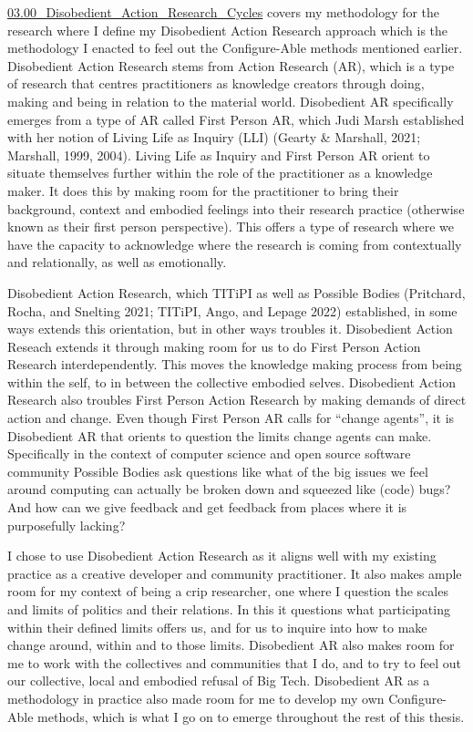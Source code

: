 \href{../../03_Disobedient_Action_Research_Cycles/sections/03.00_Disobedient_Action_Research_Cycles.md}{03.00\_Disobedient\_Action\_Research\_Cycles}
covers my methodology for the research where I define my Disobedient
Action Research approach which is the methodology I enacted to feel out
the Configure-Able methods mentioned earlier. Disobedient Action
Research stems from Action Research (AR), which is a type of research
that centres practitioners as knowledge creators through doing, making
and being in relation to the material world. Disobedient AR specifically
emerges from a type of AR called First Person AR, which Judi Marsh
established with her notion of Living Life as Inquiry (LLI) (Gearty \&
Marshall, 2021; Marshall, 1999, 2004). Living Life as Inquiry and First
Person AR orient to situate themselves further within the role of the
practitioner as a knowledge maker. It does this by making room for the
practitioner to bring their background, context and embodied feelings
into their research practice (otherwise known as their first person
perspective). This offers a type of research where we have the capacity
to acknowledge where the research is coming from contextually and
relationally, as well as emotionally.

Disobedient Action Research, which TITiPI as well as Possible Bodies
(Pritchard, Rocha, and Snelting 2021; TITiPI, Ango, and Lepage 2022)
established, in some ways extends this orientation, but in other ways
troubles it. Disobedient Action Reseach extends it through making room
for us to do First Person Action Research interdependently. This moves
the knowledge making process from being within the self, to in between
the collective embodied selves. Disobedient Action Research also
troubles First Person Action Research by making demands of direct action
and change. Even though First Person AR calls for ``change agents'', it
is Disobedient AR that orients to question the limits change agents can
make. Specifically in the context of computer science and open source
software community Possible Bodies ask questions like what of the big
issues we feel around computing can actually be broken down and squeezed
like (code) bugs? And how can we give feedback and get feedback from
places where it is purposefully lacking?

I chose to use Disobedient Action Research as it aligns well with my
existing practice as a creative developer and community practitioner. It
also makes ample room for my context of being a crip researcher, one
where I question the scales and limits of politics and their relations.
In this it questions what participating within their defined limits
offers us, and for us to inquire into how to make change around, within
and to those limits. Disobedient AR also makes room for me to work with
the collectives and communities that I do, and to try to feel out our
collective, local and embodied refusal of Big Tech. Disobedient AR as a
methodology in practice also made room for me to develop my own
Configure-Able methods, which is what I go on to emerge throughout the
rest of this thesis.

